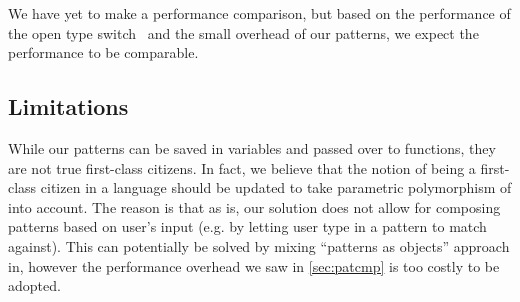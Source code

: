 We have yet to make a performance comparison, but based on the performance of 
the open type switch~\cite{TS12} and the small overhead of our patterns, we 
expect the performance to be comparable.

\subsection{Limitations}
\label{sec:ommlimit}

While our patterns can be saved in variables and passed over to functions, they 
are not true first-class citizens. In fact, we believe that the notion of being 
a first-class citizen in a language should be updated to take parametric 
polymorphism of \Cpp{} into account. The reason is that as is, our solution does
not allow for composing patterns based on user's input (e.g. by letting user 
type in a pattern to match against). This can potentially be solved by mixing 
``patterns as objects'' approach in, however the performance overhead we saw in 
\textsection\ref{sec:patcmp} is too costly to be adopted.

